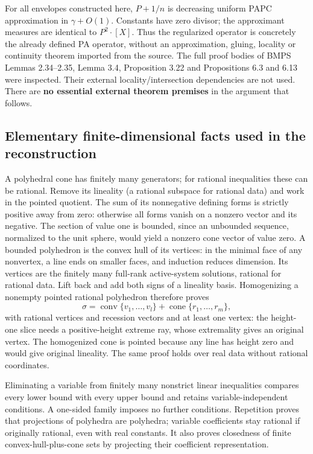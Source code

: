 \documentclass[
  11pt,
]{article}
\begin{document}
For all envelopes constructed here, \(P+1/n\) is decreasing uniform PAPC
approximation in \(\gamma+O(1)\). Constants have zero divisor; the
approximant measures are identical to \(P^2\cdot[X]\). Thus the
regularized operator is concretely the already defined PA operator,
without an approximation, gluing, locality or continuity theorem
imported from the source. The full proof bodies of BMPS Lemmas
2.34--2.35, Lemma 3.4, Proposition 3.22 and Propositions 6.3 and 6.13
were inspected. Their external locality/intersection dependencies are
not used. There are \textbf{no essential external theorem premises} in
the argument that follows.

\subsection{Elementary finite-dimensional facts used in the
reconstruction}\label{elementary-finite-dimensional-facts-used-in-the-reconstruction}

A polyhedral cone has finitely many generators; for rational
inequalities these can be rational. Remove its lineality (a rational
subspace for rational data) and work in the pointed quotient. The sum of
its nonnegative defining forms is strictly positive away from zero:
otherwise all forms vanish on a nonzero vector and its negative. The
section of value one is bounded, since an unbounded sequence, normalized
to the unit sphere, would yield a nonzero cone vector of value zero. A
bounded polyhedron is the convex hull of its vertices: in the minimal
face of any nonvertex, a line ends on smaller faces, and induction
reduces dimension. Its vertices are the finitely many full-rank
active-system solutions, rational for rational data. Lift back and add
both signs of a lineality basis. Homogenizing a nonempty pointed
rational polyhedron therefore proves \[
 \sigma=\operatorname{conv}\{v_1,\ldots,v_l\}
                    +\operatorname{cone}\{r_1,\ldots,r_m\},     \tag{8}
\] with rational vertices and recession vectors and at least one vertex:
the height-one slice needs a positive-height extreme ray, whose
extremality gives an original vertex. The homogenized cone is pointed
because any line has height zero and would give original lineality. The
same proof holds over real data without rational coordinates.

Eliminating a variable from finitely many nonstrict linear inequalities
compares every lower bound with every upper bound and retains
variable-independent conditions. A one-sided family imposes no further
conditions. Repetition proves that projections of polyhedra are
polyhedra; variable coefficients stay rational if originally rational,
even with real constants. It also proves closedness of finite
convex-hull-plus-cone sets by projecting their coefficient
representation.
\end{document}
